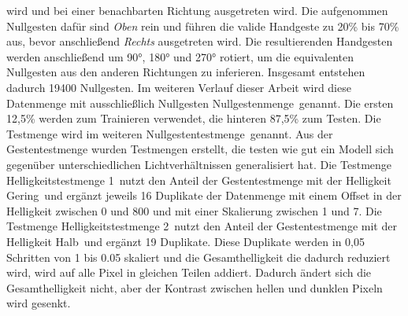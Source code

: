 wird und bei einer benachbarten Richtung ausgetreten wird. Die aufgenommen Nullgesten dafür sind \textit{Oben} rein und führen die valide Handgeste zu 20\% bis 70\% aus, bevor anschließend \textit{Rechts}
ausgetreten wird. Die resultierenden Handgesten werden anschließend um 90°, 180° und 270° rotiert, um die equivalenten Nullgesten aus den anderen Richtungen zu inferieren. Insgesamt entstehen dadurch 19400
Nullgesten. Im weiteren Verlauf dieser Arbeit wird diese Datenmenge mit ausschließlich Nullgesten \glqq Nullgestenmenge\grqq\ genannt. Die ersten 12,5\% werden zum Trainieren verwendet, die hinteren 87,5\% zum
Testen. Die Testmenge wird im weiteren \glqq Nullgestentestmenge\grqq\ genannt.
\newline
\newline
Aus der Gestentestmenge wurden Testmengen erstellt, die testen wie gut ein Modell sich gegenüber unterschiedlichen Lichtverhältnissen generalisiert hat. Die Testmenge \glqq Helligkeitstestmenge 1\grqq\
nutzt den Anteil der Gestentestmenge mit der Helligkeit \glqq Gering\grqq\ und ergänzt jeweils 16 Duplikate der Datenmenge mit einem Offset in der Helligkeit zwischen 0 und 800 und mit einer Skalierung
zwischen 1 und 7. Die Testmenge \glqq Helligkeitstestmenge 2\grqq\ nutzt den Anteil der Gestentestmenge mit der Helligkeit \glqq Halb\grqq\ und ergänzt 19 Duplikate. Diese Duplikate werden in 0,05 Schritten
von 1 bis 0.05 skaliert und die Gesamthelligkeit die dadurch reduziert wird, wird auf alle Pixel in gleichen Teilen addiert. Dadurch ändert sich die Gesamthelligkeit nicht, aber der Kontrast zwischen hellen
und dunklen Pixeln wird gesenkt.